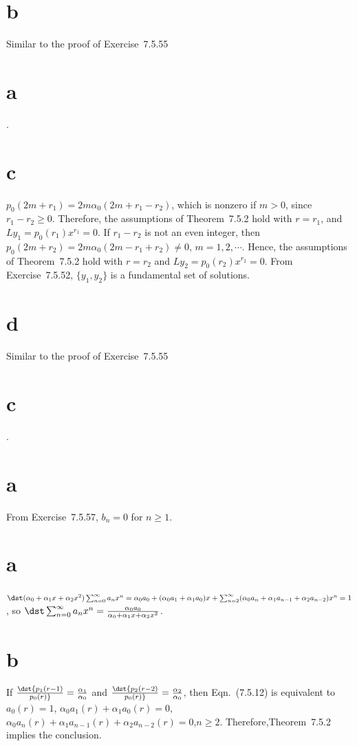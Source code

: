 \documentclass[dvips]{book}
\renewcommand{\exer}[1]{\par\medskip\;\noindent{\color{red}\bf #1.}}
\numberwithin{example}{section}
\numberwithin{equation}{section}
\numberwithin{theorem}{section}
\numberwithin{table}{section}
\numberwithin{figure}{section}
\begin{document}
\part{b} Similar to the proof of Exercise~7.5.55\part{a}.

\part{c}
$p_0(2m+r_1)=2m\alpha_0(2m+r_1-r_2)$,
which is nonzero if $m>0$, since $r_1-r_2\ge0$. Therefore, the
assumptions of Theorem~7.5.2 hold with $r=r_1$, and
$Ly_1=p_0(r_1)x^{r_1}=0$.
If $r_1-r_2$ is not an even integer, then
$p_0(2m+r_2)=2m\alpha_0(2m-r_1+r_2)\ne0$, $m=1,2,\cdots$.
Hence, the assumptions of Theorem~7.5.2 hold with $r=r_2$ and
 $Ly_2=p_0(r_2)x^{r_2}=0$.
From Exercise~7.5.52,
$\{y_1,y_2\}$ is a fundamental set of solutions.

\part{d}
 Similar to the proof of Exercise~7.5.55\part{c}.




\exer{7.5.58}
\part{a} From Exercise~7.5.57, $b_n=0$ for $n\ge1$.


\exer{7.5.60} \part{a}
$\dst(\alpha_0+\alpha_1x+\alpha_2x^2)\sum_{n=0}^\infty a_nx^n=
\alpha_0a_0+ (\alpha_0a_1+\alpha_1a_0)x+
\sum_{n=2}^\infty(\alpha_0a_n+\alpha_1a_{n-1}+\alpha_2a_{n-2})x^n=1$,
so $\dst\sum_{n=0}^\infty
a_nx^n={\alpha_0a_0\over\alpha_0+\alpha_1x+\alpha_2x^2}$.

\part{b}  If
$\dst{p_1(r-1)\over p_0(r)}=
{\alpha_1\over\alpha_0}$ and
$\dst{p_2(r-2)\over p_0(r)}=
{\alpha_2\over\alpha_0}$, then Eqn.~(7.5.12) is equivalent to
$a_0(r)=1$, $\alpha_0a_1(r)+\alpha_1a_0(r)=0$, $\alpha_0a_n(r)
+\alpha_1a_{n-1}(r)+\alpha_2a_{n-2}(r)=0$,\quad  $n\ge2$.
Therefore,Theorem~7.5.2 implies the conclusion.
\end{document}
